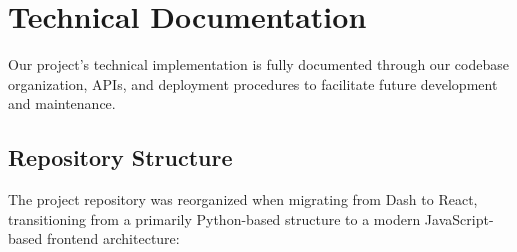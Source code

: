 \documentclass[12pt]{article}
\begin{document}
\section{Technical Documentation}

Our project's technical implementation is fully documented through our codebase organization, APIs, and deployment procedures to facilitate future development and maintenance.

\subsection{Repository Structure}

The project repository was reorganized when migrating from Dash to React, transitioning from a primarily Python-based structure to a modern JavaScript-based frontend architecture:
\end{document}
